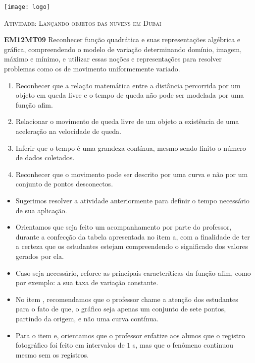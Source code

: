\documentclass[10 pt,usenames,dvipsnames, oneside]{article}
\begin{document}
\begin{center}
  \begin{minipage}[l]{3cm}
\texttt{[image: logo]}    
\end{minipage}\hfill
\begin{minipage}[r]{.8\textwidth}
 {\Large \scshape Atividade: Lançando objetos das nuvens em Dubai}  
\end{minipage}
\end{center}
\vspace{.2cm}

\ifdefined\prof
\begin{objetivos}
\item \textbf{EM12MT09} Reconhecer função quadrática e suas representações algébrica e gráfica, compreendendo o
modelo de variação determinando domínio, imagem, máximo e mínimo, e utilizar essas noções e
representações para resolver problemas como os de movimento uniformemente variado.
\end{objetivos}

\begin{goals}
\begin{enumerate}
\item Reconhecer que a relação matemática entre a distância percorrida por um objeto em queda livre e o tempo de queda não pode ser modelada por uma função afim.
\item Relacionar o movimento de queda livre de um objeto a existência de uma aceleração na velocidade de queda.
\item Inferir que o tempo é uma grandeza contínua, mesmo sendo finito o número de dados coletados.
\item Reconhecer que o movimento pode ser descrito por uma curva e não por um conjunto de pontos desconectos.
\end{enumerate}

\tcblower

\begin{itemize}
\item Sugerimos resolver a atividade anteriormente para definir o tempo necessário de sua aplicação.
\item Orientamos que seja feito um acompanhamento por parte do professor, durante a confecção da tabela apresentada no item a, com a finalidade de ter a certeza que os estudantes estejam compreendendo o significado dos valores gerados por ela.
\item Caso seja necessário, reforce as principais caracteríticas da função afim, como por exemplo: a sua taxa de variação constante.
\item No item , recomendamos que o professor chame a atenção dos estudantes para o fato de que, o gráfico seja apenas um conjunto de sete pontos, partindo da origem, e não uma curva contínua.
\item Para o item e, orientamos que o professor enfatize aos alunos que o registro fotográfico foi feito em intervalos de $1$ s, mas que o fenômeno continuou mesmo sem os registros.
\end{itemize}
\end{goals}
\end{document}
